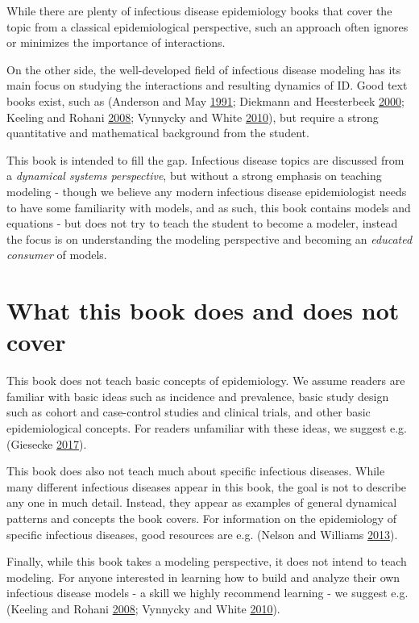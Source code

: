 \documentclass[]{book}
\theoremstyle{definition}
\theoremstyle{definition}
\theoremstyle{definition}
\theoremstyle{remark}
\begin{document}
While there are plenty of infectious disease epidemiology books that
cover the topic from a classical epidemiological perspective, such an
approach often ignores or minimizes the importance of interactions.

On the other side, the well-developed field of infectious disease
modeling has its main focus on studying the interactions and resulting
dynamics of ID. Good text books exist, such as (Anderson and May
\protect\hyperlink{ref-anderson91}{1991}; Diekmann and Heesterbeek
\protect\hyperlink{ref-diekmann00}{2000}; Keeling and Rohani
\protect\hyperlink{ref-keeling08}{2008}; Vynnycky and White
\protect\hyperlink{ref-vynnycky10}{2010}), but require a strong
quantitative and mathematical background from the student.

This book is intended to fill the gap. Infectious disease topics are
discussed from a \emph{dynamical systems perspective}, but without a
strong emphasis on teaching modeling - though we believe any modern
infectious disease epidemiologist needs to have some familiarity with
models, and as such, this book contains models and equations - but does
not try to teach the student to become a modeler, instead the focus is
on understanding the modeling perspective and becoming an \emph{educated
consumer} of models.

\hypertarget{what-this-book-does-and-does-not-cover}{%
\section{What this book does and does not
cover}\label{what-this-book-does-and-does-not-cover}}

This book does not teach basic concepts of epidemiology. We assume
readers are familiar with basic ideas such as incidence and prevalence,
basic study design such as cohort and case-control studies and clinical
trials, and other basic epidemiological concepts. For readers unfamiliar
with these ideas, we suggest e.g. (Giesecke
\protect\hyperlink{ref-giesecke17}{2017}).

This book does also not teach much about specific infectious diseases.
While many different infectious diseases appear in this book, the goal
is not to describe any one in much detail. Instead, they appear as
examples of general dynamical patterns and concepts the book covers. For
information on the epidemiology of specific infectious diseases, good
resources are e.g. (Nelson and Williams
\protect\hyperlink{ref-nelson13}{2013}).

Finally, while this book takes a modeling perspective, it does not
intend to teach modeling. For anyone interested in learning how to build
and analyze their own infectious disease models - a skill we highly
recommend learning - we suggest e.g. (Keeling and Rohani
\protect\hyperlink{ref-keeling08}{2008}; Vynnycky and White
\protect\hyperlink{ref-vynnycky10}{2010}).
\end{document}
